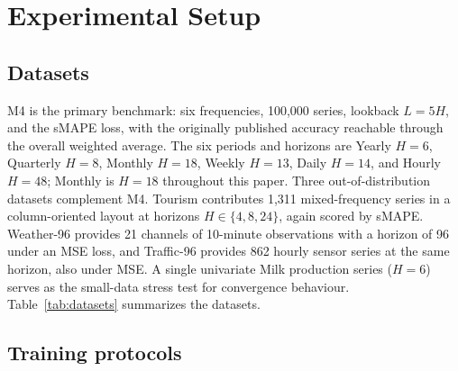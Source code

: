 %
%

\section{Experimental Setup}
\label{sec:setup}

\subsection{Datasets}
\label{sec:setup:data}

M4 \citep{makridakis2020m4} is the primary benchmark: six frequencies,
100{,}000 series, lookback $L = 5H$, and the sMAPE loss, with the
originally published accuracy reachable through the overall weighted
average. The six periods and horizons are Yearly $H = 6$, Quarterly
$H = 8$, Monthly $H = 18$, Weekly $H = 13$, Daily $H = 14$, and Hourly
$H = 48$; Monthly is $H = 18$ throughout this paper. Three
out-of-distribution datasets complement M4. Tourism contributes
1{,}311 mixed-frequency series in a column-oriented layout at horizons
$H \in \{4, 8, 24\}$, again scored by sMAPE. Weather-96 provides
21 channels of 10-minute observations with a horizon of 96 under an MSE
loss, and Traffic-96 provides 862 hourly sensor series at the same
horizon, also under MSE. A single univariate Milk production series
($H = 6$) serves as the small-data stress test for convergence
behaviour. Table~\ref{tab:datasets} summarizes the datasets.

\subsection{Training protocols}
\label{sec:setup:protocols}

